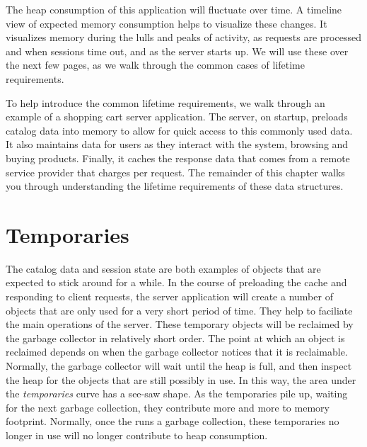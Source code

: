 The heap consumption of this application will fluctuate over time. A timeline
view of expected memory consumption helps to visualize these changes. It
visualizes memory during the lulls and peaks of activity, as requests are
processed and when sessions time out, and as the server starts up. We will use
these over the next few pages, as we walk through the common cases of lifetime
requirements.




To help introduce the common lifetime requirements, we walk through an example of
a shopping cart server application. The server, on startup, preloads catalog data
into memory to allow for quick access to this commonly used data. It also
maintains data for users as they interact with the system, browsing and buying
products. Finally, it caches the response data that comes from a remote service
provider that charges per request. The remainder of this chapter walks you
through understanding the lifetime requirements of these data structures.

\section{Temporaries}
\label{sec:temporary-lifetime}

The catalog data and session state are both examples of objects that are expected
to stick around for a while. In the course of preloading the cache and responding
to client requests, the server application will create a number of objects that
are only used for a very short period of time.
They help to faciliate the main
operations of the server. These temporary objects will be reclaimed by the \jres
garbage collector in relatively short order. The point at which an object is
reclaimed depends on when the garbage collector notices that it is reclaimable.
Normally, the garbage collector will wait until the heap is full, and then
inspect the heap for the objects that are still possibly in use. In this way, the
area under the \emph{temporaries} curve has a see-saw shape. As the temporaries
pile up, waiting for the next garbage collection, they contribute more and more
to memory footprint. Normally, once the \jre runs a garbage collection, these
temporaries no longer in use will no longer contribute to heap consumption.

